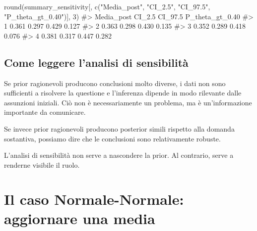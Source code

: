 \documentclass[
  italian,
  letterpaper,
  a4paper,
  11pt,
  open=any]{scrbook}
\newenvironment{Shaded}{\begin{snugshade}}{\end{snugshade}}
\newcommand{\CommentTok}[1]{\textcolor[rgb]{0.37,0.37,0.37}{#1}}
\newcommand{\DecValTok}[1]{\textcolor[rgb]{0.68,0.00,0.00}{#1}}
\newcommand{\FunctionTok}[1]{\textcolor[rgb]{0.28,0.35,0.67}{#1}}
\newcommand{\NormalTok}[1]{\textcolor[rgb]{0.00,0.23,0.31}{#1}}
\newcommand{\StringTok}[1]{\textcolor[rgb]{0.13,0.47,0.30}{#1}}
\theoremstyle{plain}
\theoremstyle{definition}
\theoremstyle{definition}
\theoremstyle{remark}
\begin{document}
\begin{Shaded}
\begin{Highlighting}[]
\FunctionTok{round}\NormalTok{(summary\_sensitivity[, }\FunctionTok{c}\NormalTok{(}\StringTok{"Media\_post"}\NormalTok{, }\StringTok{"CI\_2.5"}\NormalTok{, }\StringTok{"CI\_97.5"}\NormalTok{, }\StringTok{"P\_theta\_gt\_0.40"}\NormalTok{)], }\DecValTok{3}\NormalTok{)}
\CommentTok{\#\textgreater{}   Media\_post CI\_2.5 CI\_97.5 P\_theta\_gt\_0.40}
\CommentTok{\#\textgreater{} 1      0.361  0.297   0.429           0.127}
\CommentTok{\#\textgreater{} 2      0.363  0.298   0.430           0.135}
\CommentTok{\#\textgreater{} 3      0.352  0.289   0.418           0.076}
\CommentTok{\#\textgreater{} 4      0.381  0.317   0.447           0.282}
\end{Highlighting}
\end{Shaded}

\subsection{Come leggere l'analisi di
sensibilità}\label{come-leggere-lanalisi-di-sensibilituxe0}

Se prior ragionevoli producono conclusioni molto diverse, i dati non
sono sufficienti a risolvere la questione e l'inferenza dipende in modo
rilevante dalle assunzioni iniziali. Ciò non è necessariamente un
problema, ma è un'informazione importante da comunicare.

Se invece prior ragionevoli producono posterior simili rispetto alla
domanda sostantiva, possiamo dire che le conclusioni sono relativamente
robuste.

\begin{tcolorbox}[enhanced jigsaw, arc=.35mm, bottomrule=.15mm, bottomtitle=1mm, breakable, colback=white, colbacktitle=quarto-callout-note-color!10!white, colframe=quarto-callout-note-color-frame, coltitle=black, left=2mm, leftrule=.75mm, opacityback=0, opacitybacktitle=0.6, rightrule=.15mm, title=\textcolor{quarto-callout-note-color}{\faInfo}\hspace{0.5em}{Nota}, titlerule=0mm, toprule=.15mm, toptitle=1mm]

L'analisi di sensibilità non serve a nascondere la prior. Al contrario,
serve a renderne visibile il ruolo.

\end{tcolorbox}

\section{Il caso Normale-Normale: aggiornare una
media}\label{sec-normal-normal-update}
\end{document}
